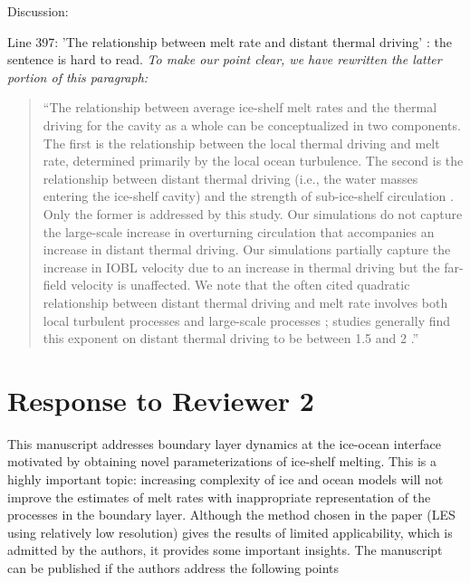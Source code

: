 \documentclass[tc, manuscript]{copernicus}
\begin{document}
Discussion:\vspace{12pt}

Line 397: 'The relationship between melt rate and distant thermal driving' : the sentence is hard to read.
\textit{To make our point clear, we have rewritten the latter portion of this paragraph:}
\begin{quote}
``The relationship between average ice-shelf melt rates and the thermal driving for the cavity as a whole can be conceptualized in two components. The first is the relationship between the local thermal driving and melt rate, determined primarily by the local ocean turbulence. The second is the relationship between distant thermal driving (i.e., the water masses entering the ice-shelf cavity) and the strength of sub-ice-shelf circulation \citep{holland_response_2008}. Only the former is addressed by this study. Our simulations do not capture the large-scale increase in overturning circulation that accompanies an increase in distant thermal driving. Our simulations partially capture the increase in IOBL velocity due to an increase in thermal driving but the far-field velocity is unaffected. We note that the often cited quadratic relationship between distant thermal driving and melt rate involves both local turbulent processes and large-scale processes \citep{holland_response_2008}; studies generally find this exponent on distant thermal driving to be between 1.5 and 2 \citep{favier_assessment_2019, jourdain_ocean_2017, little_how_2009}.''
\end{quote}\vspace{12pt}


\section{Response to Reviewer 2}

This manuscript addresses boundary layer dynamics at the ice-ocean interface motivated by obtaining novel parameterizations of ice-shelf melting. This is a highly important topic: increasing complexity of ice and ocean models will not improve the estimates of melt rates with inappropriate representation of the processes in the boundary layer. Although the method chosen in the paper (LES using relatively low resolution) gives the results of limited applicability, which is admitted by the authors, it provides some important insights. The manuscript can be published if the authors address the following points\vspace{12pt}
\end{document}
